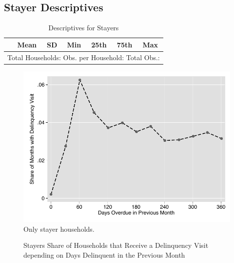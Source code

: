 \documentclass[12pt]{article}
\begin{document}
\subsection{Stayer Descriptives}\label{appendix:stayerdescriptives}


\begin{table}[H]
\centering
\caption{Descriptives for Stayers}\label{table:descriptives_stayers}
\vspace{-2mm}
\begin{tabular}{l*{1}{cccccc}}
\toprule
 & Mean & SD & Min & 25th & 75th & Max  \\
\midrule

\bottomrule
\multicolumn{7}{c}{Total Households:   Obs. per Household:  Total Obs.: }
\end{tabular}
\end{table}

\begin{figure}[H]
\centering
\caption{Stayers Share of Households that Receive a Delinquency Visit \\ depending on Days Delinquent in the Previous Month}\label{figure:dc_hazardstayers}
\includegraphics[scale=.7]{tables/connected_visit_hazard.pdf} \\
{ \footnotesize Only stayer households. }
\end{figure}

\end{document}
